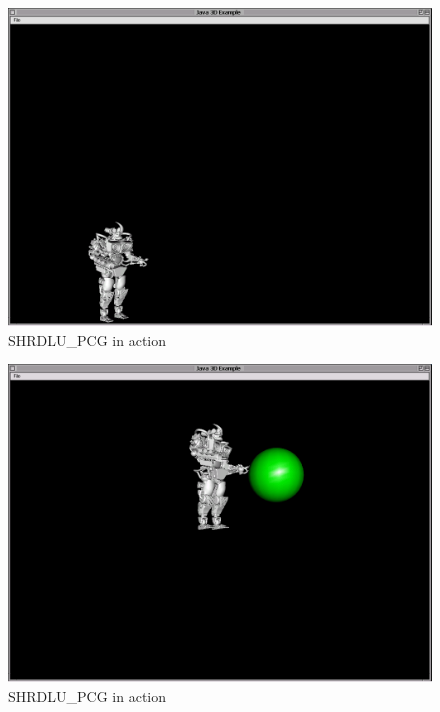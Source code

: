 \documentclass{book}
\begin{document}
\begin{htmlonly}

\begin{figure}
\begin{center}
\includegraphics{Image1.png}
\end{center}
\caption{\label{Fig:SHRDLU:ROBOT}SHRDLU\_PCG in action}
\end{figure}

\end{htmlonly}


\begin{latexonly}

\begin{figure}
\begin{center}
\includegraphics[scale=0.3]{Image2.png}
\end{center}
\caption{\label{Fig:SHRDLU:CanvasClass}SHRDLU\_PCG in action}
\end{figure}

\end{latexonly}
\end{document}
